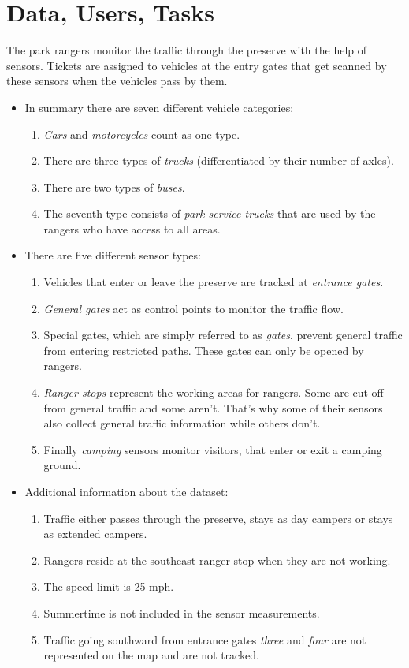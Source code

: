 \documentclass{article}
\begin{document}
\section{Data, Users, Tasks}
The park rangers monitor the traffic through the preserve with the help of sensors. Tickets are assigned to vehicles at the entry gates that get scanned by these sensors when the vehicles pass by them.
\begin{itemize}

\item In summary there are seven different vehicle categories:

	\begin{enumerate}
	\item \textit{Cars} and \textit{motorcycles} count as one type.
	\item There are three types of \textit{trucks} (differentiated by their number of axles).
	\item There are two types of \textit{buses}.
	\item The seventh type consists of \textit{park service trucks} that are used by the rangers who have access to all areas.
	\end{enumerate}

\item There are five different sensor types:

	\begin{enumerate}
	\item Vehicles that enter or leave the preserve are tracked at \textit{entrance gates}.
	\item \textit{General gates} act as control points to monitor the traffic flow.
	\item Special gates, which are simply referred to as \textit{gates}, prevent general traffic from entering restricted paths. These gates can only be opened by rangers.
	\item \textit{Ranger-stops} represent the working areas for rangers. Some are cut off from general traffic and some aren't. That's why some of their sensors also collect general traffic information while others don't.
	\item Finally \textit{camping} sensors monitor visitors, that enter or exit a camping ground.
	\end{enumerate}
\newpage
\item Additional information about the dataset:

	\begin{enumerate}		
	\item Traffic either passes through the preserve, stays as day campers or stays as extended campers.
	\item Rangers reside at the southeast ranger-stop when they are not working.
	\item The speed limit is 25 mph.
	\item Summertime is not included in the sensor measurements.
	\item Traffic going southward from entrance gates \textit{three} and \textit{four} are not represented on the map and are not tracked.
	\end{enumerate}


\end{itemize}
\end{document}
